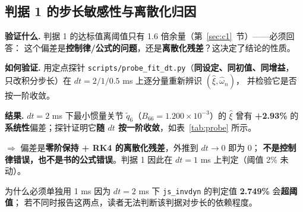 \documentclass[11pt,a4paper]{ctexart}
\begin{document}
\subsection{判据 1 的步长敏感性与离散化归因}\label{sec:dtprobe}

\textbf{验证什么.} 判据 1 的达标值离阈值只有 1.6 倍余量（第~\ref{sec:c1}~节）——必须回答：
这个偏差是\textbf{控制律/公式的问题}，还是\textbf{离散化残差}？这决定了结论的性质。

\textbf{如何验证.} 用定点探针 \texttt{scripts/probe\_fit\_dt.py}（\textbf{同设定、同初值、同增益}，
只改积分步长）在 $dt=2/1/0.5$ ms 上逐分量重新辨识 $(\hat\xi,\hat\omega_n)$，
并检验它是否按一阶收敛。

\textbf{结果.} $dt=2$ ms 下最小惯量关节 $\tilde q_6$（$B_{66}=1.200\times10^{-3}$）的 $\hat\xi$
曾有 \textbf{+2.93\%} 的\textbf{系统性}偏差；探针证明它\textbf{随 $dt$ 按一阶收敛}，如表~\ref{tab:probe} 所示。

\begin{table}[H]
\centering
\small
\caption{判据 1 的步长定点探针（逐分量重新辨识 $\hat\xi$）}\label{tab:probe}
\end{table}

$\Rightarrow$ 偏差是\textbf{零阶保持 + RK4 的离散化残差}，外推到 $dt\to0$ 即为 0；
\textbf{不是控制律错误，也不是书的公式错误}。判据 1 因此在 $dt=1$ ms 上判定（阈值 2\% 未动）。

\begin{warnbox}{为什么必须单独用 1 ms}
因为 $dt=2$ ms 下 \texttt{js\_invdyn} 的判定值 \textbf{2.749\%} 会\textbf{超阈值}；
若不同时报告这两点，读者无法判断该判据对步长的依赖程度。
\end{warnbox}
\end{document}
